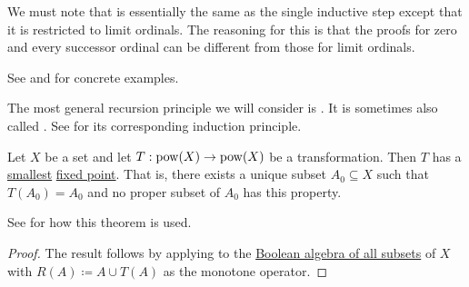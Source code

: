 \begin{remark}
  We must note that  is essentially the same as the single inductive step  except that it is restricted to limit ordinals. The reasoning for this is that the proofs for zero and every successor ordinal can be different from those for limit ordinals.

  See  and  for concrete examples.
\end{remark}

\begin{theorem}\label{thm:structural_recursion}\mimprovised
  The most general recursion principle we will consider is . It is sometimes also called . See  for its corresponding induction principle.

  Let \( X \) be a set and let \( T: \operatorname{pow}(X) \to \operatorname{pow}(X) \) be a transformation. Then \( T \) has a \hyperref[def:partially_ordered_set_extremal_points/maximum_and_minimum]{smallest} \hyperref[def:fixed_point]{fixed point}. That is, there exists a unique subset \( A_0 \subseteq X \) such that \( T(A_0) = A_0 \) and no proper subset of \( A_0 \) has this property.

  See  for how this theorem is used.
\end{theorem}
\begin{proof}
  The result follows by applying  to the \hyperref[thm:boolean_algebra_of_subsets]{Boolean algebra of all subsets} of \( X \) with \( R(A) \coloneqq A \cup T(A) \) as the monotone operator.
\end{proof}

